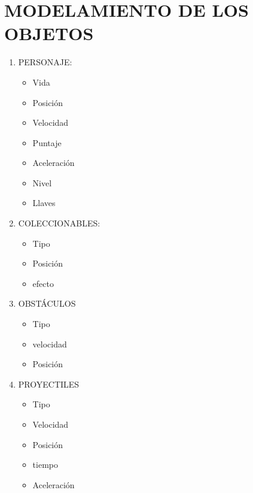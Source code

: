 \documentclass{article}
\begin{document}
\section{MODELAMIENTO DE LOS OBJETOS}
\begin{enumerate}
\item PERSONAJE:
\begin{itemize}
    \item Vida
    \item Posición
    \item Velocidad
    \item Puntaje
    \item Aceleración
    \item Nivel
    \item Llaves
\end{itemize}
\item COLECCIONABLES:
\begin{itemize}
    \item Tipo
    \item Posición
    \item efecto
\end{itemize}
\item OBSTÁCULOS
\begin{itemize}
    \item Tipo
    \item velocidad
    \item Posición
\end{itemize}
\item PROYECTILES
\begin{itemize}
    \item Tipo
    \item Velocidad
    \item Posición
    \item tiempo
    \item Aceleración
\end{itemize}
\end{enumerate}
\end{document}

